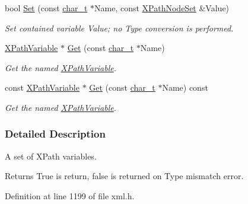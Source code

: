 \begin{DoxyCompactItemize}
bool \hyperlink{classphys_1_1xml_1_1XPathVariableSet_a61fe3aa60d13a4a224d301456a230a7c}{Set} (const \hyperlink{namespacephys_1_1xml_afc87705cd1c2917d87b879715a2d8f6e}{char\_\-t} $\ast$Name, const \hyperlink{classphys_1_1xml_1_1XPathNodeSet}{XPathNodeSet} \&Value)
\begin{DoxyCompactList}\small\item\em Set contained variable Value; no Type conversion is performed. \item\end{DoxyCompactList}\item 
\hyperlink{classphys_1_1xml_1_1XPathVariable}{XPathVariable} $\ast$ \hyperlink{classphys_1_1xml_1_1XPathVariableSet_aaf4a46b271298bbb86a6379567e590ee}{Get} (const \hyperlink{namespacephys_1_1xml_afc87705cd1c2917d87b879715a2d8f6e}{char\_\-t} $\ast$Name)
\begin{DoxyCompactList}\small\item\em Get the named \hyperlink{classphys_1_1xml_1_1XPathVariable}{XPathVariable}. \item\end{DoxyCompactList}\item 
const \hyperlink{classphys_1_1xml_1_1XPathVariable}{XPathVariable} $\ast$ \hyperlink{classphys_1_1xml_1_1XPathVariableSet_a64274e4889036c318c701614d2cfa5ab}{Get} (const \hyperlink{namespacephys_1_1xml_afc87705cd1c2917d87b879715a2d8f6e}{char\_\-t} $\ast$Name) const 
\begin{DoxyCompactList}\small\item\em Get the named \hyperlink{classphys_1_1xml_1_1XPathVariable}{XPathVariable}. \item\end{DoxyCompactList}\end{DoxyCompactItemize}


\subsubsection{Detailed Description}
A set of XPath variables. \begin{DoxyReturn}{Returns}
True is return, false is returned on Type mismatch error. 
\end{DoxyReturn}


Definition at line 1199 of file xml.h.



